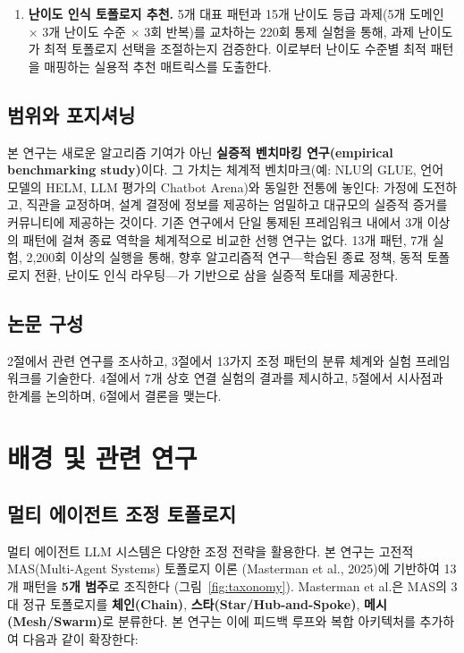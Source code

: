 \documentclass[a4paper,11pt]{article}
\begin{document}
\begin{enumerate}
    \item \textbf{난이도 인식 토폴로지 추천.} 5개 대표 패턴과 15개 난이도 등급 과제(5개 도메인 $\times$ 3개 난이도 수준 $\times$ 3회 반복)를 교차하는 220회 통제 실험을 통해, 과제 난이도가 최적 토폴로지 선택을 조절하는지 검증한다. 이로부터 난이도 수준별 최적 패턴을 매핑하는 실용적 추천 매트릭스를 도출한다.
\end{enumerate}

\subsection{범위와 포지셔닝}

본 연구는 새로운 알고리즘 기여가 아닌 \textbf{실증적 벤치마킹 연구(empirical benchmarking study)}이다. 그 가치는 체계적 벤치마크(예: NLU의 GLUE, 언어 모델의 HELM, LLM 평가의 Chatbot Arena)와 동일한 전통에 놓인다: 가정에 도전하고, 직관을 교정하며, 설계 결정에 정보를 제공하는 엄밀하고 대규모의 실증적 증거를 커뮤니티에 제공하는 것이다. 기존 연구에서 단일 통제된 프레임워크 내에서 3개 이상의 패턴에 걸쳐 종료 역학을 체계적으로 비교한 선행 연구는 없다. 13개 패턴, 7개 실험, 2,200회 이상의 실행을 통해, 향후 알고리즘적 연구---학습된 종료 정책, 동적 토폴로지 전환, 난이도 인식 라우팅---가 기반으로 삼을 실증적 토대를 제공한다.

\subsection{논문 구성}

2절에서 관련 연구를 조사하고, 3절에서 13가지 조정 패턴의 분류 체계와 실험 프레임워크를 기술한다. 4절에서 7개 상호 연결 실험의 결과를 제시하고, 5절에서 시사점과 한계를 논의하며, 6절에서 결론을 맺는다.

\section{배경 및 관련 연구}

\subsection{멀티 에이전트 조정 토폴로지}

멀티 에이전트 LLM 시스템은 다양한 조정 전략을 활용한다. 본 연구는 고전적 MAS(Multi-Agent Systems) 토폴로지 이론 (Masterman et al., 2025)에 기반하여 13개 패턴을 \textbf{5개 범주}로 조직한다 (그림~\ref{fig:taxonomy}). Masterman et al.은 MAS의 3대 정규 토폴로지를 \textbf{체인(Chain)}, \textbf{스타(Star/Hub-and-Spoke)}, \textbf{메시(Mesh/Swarm)}로 분류한다. 본 연구는 이에 피드백 루프와 복합 아키텍처를 추가하여 다음과 같이 확장한다:
\end{document}
